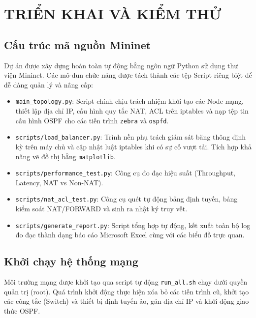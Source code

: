 \section{TRIỂN KHAI VÀ KIỂM THỬ}

\subsection{Cấu trúc mã nguồn Mininet}
Dự án được xây dựng hoàn toàn tự động bằng ngôn ngữ Python sử dụng thư viện Mininet. Các mô-đun chức năng được tách thành các tệp Script riêng biệt để dễ dàng quản lý và nâng cấp:
\begin{itemize}
    \item \texttt{main\_topology.py}: Script chính chịu trách nhiệm khởi tạo các Node mạng, thiết lập địa chỉ IP, cấu hình quy tắc NAT, ACL trên iptables và nạp tệp tin cấu hình OSPF cho các tiến trình \texttt{zebra} và \texttt{ospfd}.
    \item \texttt{scripts/load\_balancer.py}: Trình nền phụ trách giám sát băng thông định kỳ trên máy chủ và cập nhật luật iptables khi có sự cố vượt tải. Tích hợp khả năng vẽ đồ thị bằng \texttt{matplotlib}.
    \item \texttt{scripts/performance\_test.py}: Công cụ đo đạc hiệu suất (Throughput, Latency, NAT vs Non-NAT).
    \item \texttt{scripts/nat\_acl\_test.py}: Công cụ quét tự động bảng định tuyến, bảng kiểm soát NAT/FORWARD và sinh ra nhật ký truy vết.
    \item \texttt{scripts/generate\_report.py}: Script tổng hợp tự động, kết xuất toàn bộ log đo đạc thành dạng báo cáo Microsoft Excel cùng với các biểu đồ trực quan.
\end{itemize}

\subsection{Khởi chạy hệ thống mạng}
Môi trường mạng được khởi tạo qua script tự động \texttt{run\_all.sh} chạy dưới quyền quản trị (root). Quá trình khởi động thực hiện xóa bỏ các tiến trình cũ, khởi tạo các công tắc (Switch) và thiết bị định tuyến ảo, gán địa chỉ IP và khởi động giao thức OSPF. 


